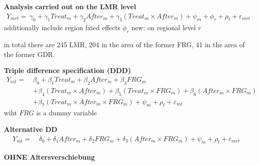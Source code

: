 \documentclass[11pt, a4paper]{article} %
\begin{document}
\textbf{Analysis carried out on the LMR level}
\begin{align}
Y_{mrt} =\ \gamma_0 + \gamma_1 Treat_{m} + \gamma_2 After_{m} + \gamma_3 (Treat_{m} \times After_{m}) + \psi_m + \phi_r + \rho_t + \varepsilon_{mrt} \label{eq:DD_LMR}
\end{align}
additionally include region fxied effects $\phi_r$
new: on regional level $r$

in total there are 245 LMR, 204 in the area of the former FRG, 41 in the area of the former GDR. 


\textbf{Triple difference specification (DDD)}
\begin{align}
Y_{mt} =\ &\beta_0 + \beta_1 Treat_{m} + \beta_2 After_{m} + \beta_3 FRG_m \nonumber\\&+ \beta_4 (Treat_{m} \times After_{m}) + \beta_5 (Treat_m \times FRG_m) + \beta_6 (After_m \times FRG_m) \nonumber\\ &+ \beta_7 (Treat_m\times After_m\times FRG_m) + \psi_m + \rho_t + \varepsilon_{mt} \label{eq:DDD}
\end{align}
wiht $FRG$ is a dummy variable 


\textbf{Alternative DD}
\begin{align}
Y_{mt} =\ &\delta_0 +  \delta_1 After_{m} + \delta_2 FRG_m + \delta_3 (After_m \times FRG_m) + \psi_m + \rho_t + \varepsilon_{mrt} \label{eq:alt_DD}
\end{align}




\textbf{OHNE Altersverschiebung}
\end{document}
